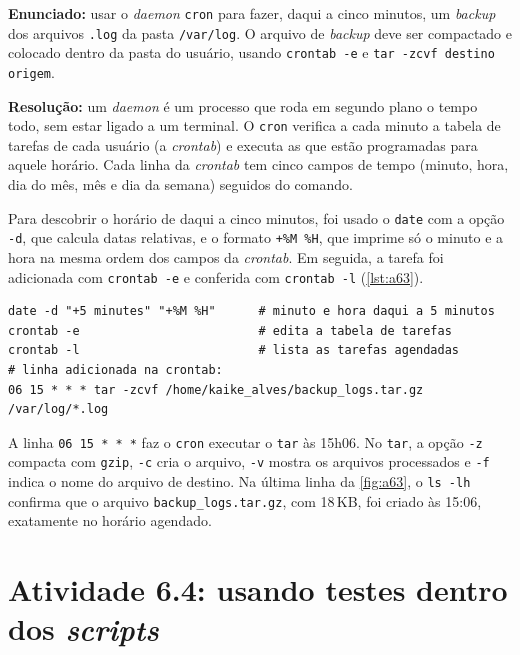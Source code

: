 \textbf{Enunciado:} usar o \textit{daemon} \texttt{cron} para fazer, daqui a cinco minutos, um
\textit{backup} dos arquivos \texttt{.log} da pasta \texttt{/var/log}. O arquivo de
\textit{backup} deve ser compactado e colocado dentro da pasta do usuário, usando
\texttt{crontab -e} e \texttt{tar -zcvf destino origem}.

\textbf{Resolução:} um \textit{daemon} é um processo que roda em segundo plano o tempo todo,
sem estar ligado a um terminal. O \texttt{cron} verifica a cada minuto a tabela de tarefas de
cada usuário (a \textit{crontab}) e executa as que estão programadas para aquele horário. Cada
linha da \textit{crontab} tem cinco campos de tempo (minuto, hora, dia do mês, mês e dia da
semana) seguidos do comando.

Para descobrir o horário de daqui a cinco minutos, foi usado o \texttt{date} com a opção
\texttt{-d}, que calcula datas relativas, e o formato \texttt{+\%M \%H}, que imprime só o
minuto e a hora na mesma ordem dos campos da \textit{crontab}. Em seguida, a tarefa foi
adicionada com \texttt{crontab -e} e conferida com \texttt{crontab -l} (\autoref{lst:a63}).

\begin{lstlisting}[caption={Atividade 6.3: tarefa agendada no \texttt{cron}},label={lst:a63}]
date -d "+5 minutes" "+%M %H"      # minuto e hora daqui a 5 minutos
crontab -e                         # edita a tabela de tarefas
crontab -l                         # lista as tarefas agendadas
# linha adicionada na crontab:
06 15 * * * tar -zcvf /home/kaike_alves/backup_logs.tar.gz /var/log/*.log
\end{lstlisting}

A linha \texttt{06 15 * * *} faz o \texttt{cron} executar o \texttt{tar} às 15h06. No
\texttt{tar}, a opção \texttt{-z} compacta com \texttt{gzip}, \texttt{-c} cria o arquivo,
\texttt{-v} mostra os arquivos processados e \texttt{-f} indica o nome do arquivo de destino.
Na última linha da \autoref{fig:a63}, o \texttt{ls -lh} confirma que o arquivo
\texttt{backup\_logs.tar.gz}, com 18\,KB, foi criado às 15:06, exatamente no horário agendado.


\section{Atividade 6.4: usando testes dentro dos \textit{scripts}}\label{sec:a64}

